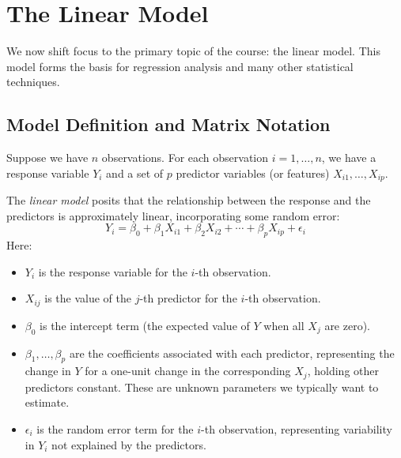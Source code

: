 \documentclass[11pt]{article}
\theoremstyle{definition}
\theoremstyle{remark}
\begin{document}
\section{The Linear Model}

We now shift focus to the primary topic of the course: the linear model. This model forms the basis for regression analysis and many other statistical techniques.

\subsection{Model Definition and Matrix Notation}

Suppose we have $n$ observations. For each observation $i = 1, \ldots, n$, we have a response variable $Y_i$ and a set of $p$ predictor variables (or features) $X_{i1}, \ldots, X_{ip}$.

The \emph{linear model} posits that the relationship between the response and the predictors is approximately linear, incorporating some random error:
\[ Y_i = \beta_0 + \beta_1 X_{i1} + \beta_2 X_{i2} + \cdots + \beta_p X_{ip} + \epsilon_i \]
Here:
\begin{itemize}
    \item $Y_i$ is the response variable for the $i$-th observation.
    \item $X_{ij}$ is the value of the $j$-th predictor for the $i$-th observation.
    \item $\beta_0$ is the intercept term (the expected value of $Y$ when all $X_j$ are zero).
    \item $\beta_1, \ldots, \beta_p$ are the coefficients associated with each predictor, representing the change in $Y$ for a one-unit change in the corresponding $X_j$, holding other predictors constant. These are unknown parameters we typically want to estimate.
    \item $\epsilon_i$ is the random error term for the $i$-th observation, representing variability in $Y_i$ not explained by the predictors.
\end{itemize}
\end{document}
